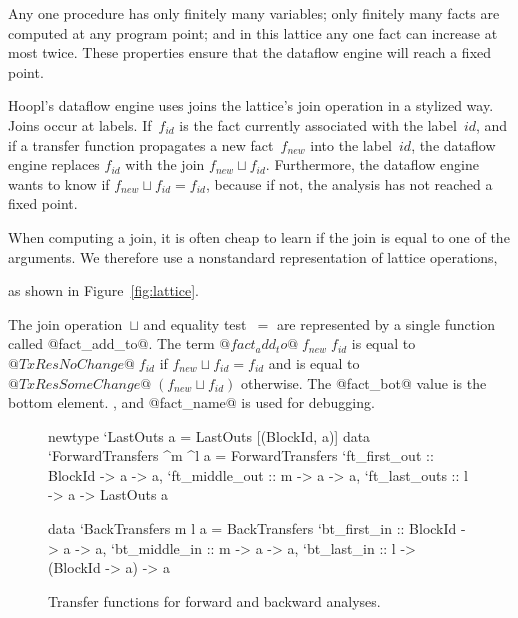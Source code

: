 \documentclass[blockstyle,preprint,natbib,nocopyrightspace]{sigplanconf}
\newcommand\ourlib{Hoopl}  %
\newcommand\join{\sqcup}
\newcommand\figref[1]{Figure~\ref{fig:#1}}
\newcommand\figlabel[1]{\label{fig:#1}}
\begin{document}
\ifcutting\else
Any one procedure has only finitely many variables;
only finitely many facts are computed at any program point;
and in this lattice any one fact can increase at most twice.
These properties
ensure that the dataflow engine will
reach a fixed point.
\fi


\ourlib's dataflow engine uses
\ifcutting joins
\else the lattice's join operation
\fi in a stylized way.
Joins occur at labels.
If~$f_{\mathit{id}}$ is the fact currently associated with the
label~$\mathit{id}$, 
and if a transfer function propagates a new fact~$f_{\mathit{new}}$
into the label~$\mathit{id}$, 
the dataflow engine replaces $f_{\mathit{id}}$ with
the join  $f_{\mathit{new}} \join f_{\mathit{id}}$.
Furthermore, the dataflow engine wants to know if
  $f_{\mathit{new}} \join f_{\mathit{id}} = f_{\mathit{id}}$,
because if not, the analysis has not reached a fixed point.



When computing a join, 
it is often cheap to learn if the join
is equal to one of the arguments.
We therefore use a nonstandard representation of lattice operations,
\iffalse
(\figref{lattice}).
\else
as shown in \figref{lattice}.
\fi
The join operation~$\join$ and equality test~$=$ are represented by a
single function called @fact_add_to@.
The term $@fact_add_to@\;f_{\mathit{new}}\;f_{\mathit{id}}$ is equal to
$@TxRes NoChange@\; f_{\mathit{id}}$ if $f_{\mathit{new}} \join f_{\mathit{id}} = f_{\mathit{id}}$
and is equal to
$@TxRes SomeChange@\; (f_{\mathit{new}} \join f_{\mathit{id}})$ otherwise.
The @fact_bot@ value is the bottom element\ifcutting.
\else, 
and @fact_name@  is used for debugging.
\fi

\begin{figure}
\begin{code}
newtype `LastOuts a = LastOuts [(BlockId, a)]
data `ForwardTransfers ^m ^l a = ForwardTransfers
 {`ft_first_out  :: BlockId -> a -> a,
  `ft_middle_out :: m       -> a -> a,
  `ft_last_outs  :: l       -> a -> LastOuts a} 

data `BackTransfers m l a = BackTransfers
 {`bt_first_in  :: BlockId -> a              -> a,
  `bt_middle_in :: m       -> a              -> a,
  `bt_last_in   :: l       -> (BlockId -> a) -> a} 
\end{code}
\caption{Transfer functions for forward and backward analyses.}
\figlabel{transfers}
\ifpagetuning\vspace*{-1ex}\fi
%
%
\end{figure}
\end{document}
